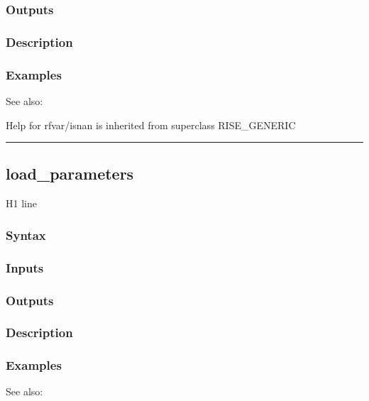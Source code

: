 \documentclass[letterpaper,10pt,english]{sphinxmanual}
\begin{document}
\subsubsection{Outputs}
\label{classes/models/@rfvar/rfvar:id47}

\subsubsection{Description}
\label{classes/models/@rfvar/rfvar:id48}

\subsubsection{Examples}
\label{classes/models/@rfvar/rfvar:id49}
See also:

Help for rfvar/isnan is inherited from superclass RISE\_GENERIC


\bigskip\hrule{}\bigskip



\subsection{load\_parameters}
\label{classes/models/@rfvar/rfvar:id50}\label{classes/models/@rfvar/rfvar:load-parameters}
H1 line


\subsubsection{Syntax}
\label{classes/models/@rfvar/rfvar:id51}

\subsubsection{Inputs}
\label{classes/models/@rfvar/rfvar:id52}

\subsubsection{Outputs}
\label{classes/models/@rfvar/rfvar:id53}

\subsubsection{Description}
\label{classes/models/@rfvar/rfvar:id54}

\subsubsection{Examples}
\label{classes/models/@rfvar/rfvar:id55}
See also:
\end{document}
